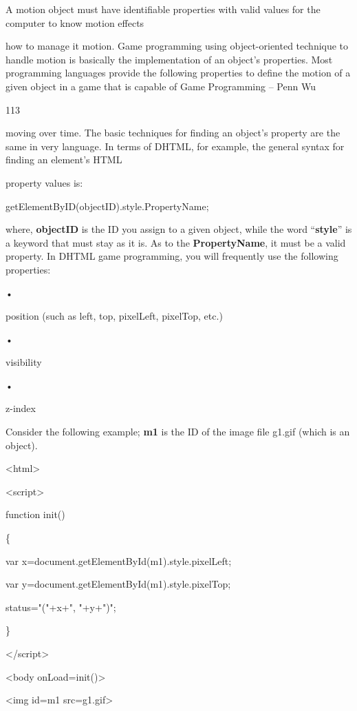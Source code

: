 \documentclass[
]{article}
\begin{document}
A motion object must have identifiable properties with valid values for
the computer to know motion effects

how to manage it motion. Game programming using object-oriented
technique to handle motion is basically the implementation of an
object's properties. Most programming languages provide the following
properties to define the motion of a given object in a game that is
capable of Game Programming -- Penn Wu

113

\protect\hypertarget{index_split_008.htmlux5cux23p114}{}{}moving over
time. The basic techniques for finding an object's property are the same
in very language. In terms of DHTML, for example, the general syntax for
finding an element's HTML

property values is:

getElementByID(objectID).style.PropertyName;

where, \textbf{objectID} is the ID you assign to a given object, while
the word ``\textbf{style}'' is a keyword that must stay as it is. As to
the \textbf{PropertyName}, it must be a valid property. In DHTML game
programming, you will frequently use the following properties:

•

position (such as left, top, pixelLeft, pixelTop, etc.)

•

visibility

•

z-index

Consider the following example; \textbf{m1} is the ID of the image file
g1.gif (which is an object).

\textless html\textgreater{}

\textless script\textgreater{}

function init()

\{

var
x=document.getElementById(\textquotesingle m1\textquotesingle).style.pixelLeft;

var
y=document.getElementById(\textquotesingle m1\textquotesingle).style.pixelTop;

status="("+x+", "+y+")";

\}

\textless/script\textgreater{}

\textless body onLoad=init()\textgreater{}

\textless img id=m1 src=g1.gif\textgreater{}
\end{document}
